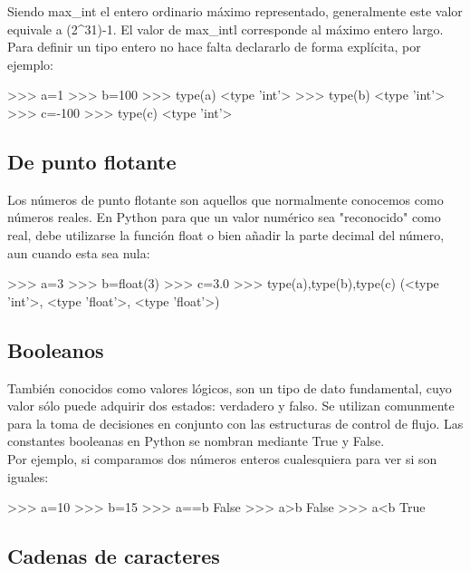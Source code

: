 Siendo max_int el entero ordinario máximo representado, generalmente este valor equivale a 
(2^31)-1. El valor de max_intl corresponde al máximo entero largo.\\

Para definir un tipo entero no hace falta declararlo de forma explícita, por ejemplo:

\begin{python}
	>>> a=1
	>>> b=100
	>>> type(a)
	<type 'int'>
	>>> type(b)
	<type 'int'>
	>>> c=-100
	>>> type(c)
	<type 'int'>
\end{python}

\subsection{De punto flotante}

Los números de punto flotante son aquellos que normalmente conocemos como números reales. 
En Python para que un valor numérico sea "reconocido" como real, debe utilizarse la función 
float o bien añadir la parte decimal del número, aun cuando esta sea nula:

\begin{python}
	>>> a=3
	>>> b=float(3)
	>>> c=3.0
	>>> type(a),type(b),type(c)
	(<type 'int'>, <type 'float'>, <type 'float'>)
\end{python}


\subsection{Booleanos}

También conocidos como valores lógicos, son un tipo de dato fundamental, cuyo valor sólo 
puede adquirir dos estados: verdadero y falso. Se utilizan comunmente para la toma de 
decisiones en conjunto con las estructuras de control de flujo. Las constantes booleanas 
en Python se nombran mediante True y False.\\

Por ejemplo, si comparamos dos números enteros cualesquiera para ver si son iguales:

\begin{python}
	>>> a=10
	>>> b=15
	>>> a==b
	False
	>>> a>b
	False
	>>> a<b
	True
\end{python}


\subsection{Cadenas de caracteres}


